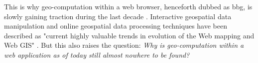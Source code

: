 This is why \ac{geo-computation} within a web browser, henceforth dubbed as \ac{bbg}, is slowly gaining traction during the last decade \cite{kulawiak_analysis_2019, panidi_hybrid_2015, hamilton_client-side_2014}. 
Interactive geospatial data manipulation and online geospatial data processing techniques have been described as "current highly valuable trends in evolution of the Web mapping and Web GIS" \cite{panidi_hybrid_2015}. 
But this also raises the question: \textit{Why is geo-computation within a web application as of today still almost nowhere to be found?} 






